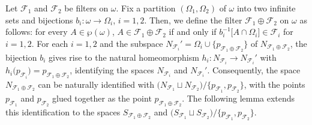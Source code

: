 \documentclass[a4paper,11pt,fleqn]{amsart}
\theoremstyle{definition}
\theoremstyle{remark}
\numberwithin{equation}{section}
\newcommand{\N}{\mathbb{N}}
\newcommand{\fF}{\mathcal{F}}
\newcommand{\wo}{{\wp(\omega)}}%
\begin{document}
Let $\fF_1$ and $\fF_2$ be filters on $\omega$. Fix a partition $(\Omega_1,\Omega_2)$ of $\omega$ into two infinite sets and bijections $b_i\colon\omega\to \Omega_i$, $i=1,2$. Then, we define the filter $\fF_1\oplus \fF_2$ on $\omega$ as follows: for every $A\in\wo$, $A\in \fF_1\oplus \fF_2$ if and only if $b_i^{-1}\big[A\cap \Omega_i\big]\in \fF_i$ for $i=1,2$. For each $i=1,2$ and the subspace $N_{\fF_i}'=\Omega_i\cup\big\{p_{\fF_1\oplus\fF_2}\big\}$ of $N_{\fF_1\oplus\fF_2}$, the bijection $b_i$ gives rise to the natural homeomorphism $h_i\colon N_{\fF_i}\to N_{\fF_i}'$ with $h_i\big(p_{\fF_i}\big)=p_{\fF_1\oplus\fF_2}$, identifying the spaces $N_{\fF_i}$ and $N_{\fF_i}'$. Consequently, the space $N_{\fF_1\oplus \fF_2}$ can be naturally identified with $\big(N_{\fF_1}\sqcup N_{\fF_2}\big)/\big\{p_{\fF_1},p_{\fF_2}\big\}$, with the points $p_{\fF_1}$ and $p_{\fF_2}$ glued together as the point $p_{\fF_1\oplus \fF_2}$. The following lemma extends this identification to the spaces $S_{\fF_1\oplus \fF_2}$ and $\big(S_{\fF_1}\sqcup S_{\fF_2}\big)/\big\{p_{\fF_1},p_{\fF_2}\big\}$.
\end{document}

